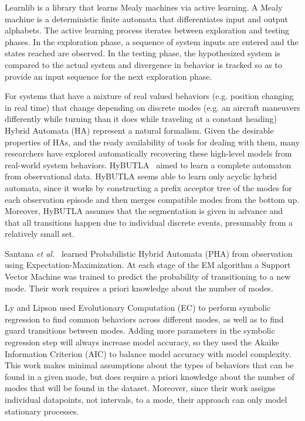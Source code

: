 \documentclass[12pt]{report}
\begin{document}
Learnlib \cite{Introduction to Active Automata Learning from
a Practical Perspective?} is a library that learns Mealy machines via active learning.  A Mealy machine is a deterministic finite automata that differentiates input and output alphabets. The active learning process iterates between exploration and testing phases.  In the exploration phase, a sequence of system inputs are entered and the states reached are observed.  In the testing phase, the hypothesized system is compared to the actual system and divergence in behavior is tracked so as to provide an input sequence for the next exploration phase.

For systems that have a mixture of real valued behaviors (e.g. position changing in real time) that change depending on discrete modes (e.g. an aircraft maneuvers differently while turning than it does while traveling at a constant heading) Hybrid Automata (HA) represent a natural formalism. 
Given the desirable properties of HAs, and the ready availability of tools for dealing with them, many researchers have explored automatically recovering these high-level models from real-world system behaviors.
HyBUTLA~\cite{niggemann2012learning} aimed to learn a complete automaton from observational data. HyBUTLA seems able to learn only acyclic hybrid automata, since it works by constructing a prefix acceptor tree of the modes for each observation episode and then merges compatible modes from the bottom up. Moreover, HyBUTLA assumes that the segmentation is given in advance and that all transitions happen due to individual discrete events, presumably from a relatively small set.


Santana \textit{et al.}~\cite{hybridmodels2015santana} learned Probabilistic Hybrid Automata (PHA) from observation using Expectation-Maximization.  At each stage of the EM algorithm a Support Vector Machine was trained to predict the probability of transitioning to a new mode. Their work requires a priori knowledge about the number of modes.


Ly and Lipson used Evolutionary Computation (EC) to perform symbolic regression \cite{Learning Symbolic Representations of Hybrid Dynamical Systems} to find common behaviors across different modes, as well as to find guard transitions between modes.  Adding more parameters in the symbolic regression step will always increase model accuracy, so they used the Akaike Information Criterion (AIC) to balance model accuracy with model complexity.  This work makes minimal assumptions about the types of behaviors that can be found in a given mode, but does require a priori knowledge about the number of modes that will be found in the dataset. Moreover, since their work assigns individual datapoints, not intervals, to a mode, their approach can only model stationary processes.
\end{document}
